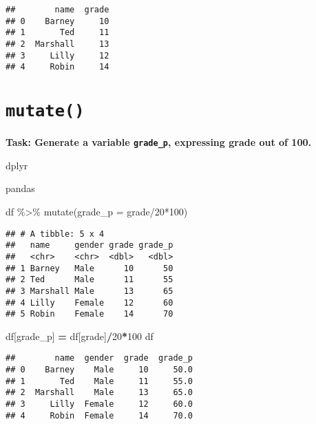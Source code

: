 \documentclass[
]{book}
\newenvironment{Shaded}{\begin{snugshade}}{\end{snugshade}}
\newcommand{\AttributeTok}[1]{\textcolor[rgb]{0.77,0.63,0.00}{#1}}
\newcommand{\DecValTok}[1]{\textcolor[rgb]{0.00,0.00,0.81}{#1}}
\newcommand{\FunctionTok}[1]{\textcolor[rgb]{0.00,0.00,0.00}{#1}}
\newcommand{\NormalTok}[1]{#1}
\newcommand{\OperatorTok}[1]{\textcolor[rgb]{0.81,0.36,0.00}{\textbf{#1}}}
\newcommand{\SpecialCharTok}[1]{\textcolor[rgb]{0.00,0.00,0.00}{#1}}
\newcommand{\StringTok}[1]{\textcolor[rgb]{0.31,0.60,0.02}{#1}}
\begin{document}
\begin{verbatim}
##        name  grade
## 0    Barney     10
## 1       Ted     11
## 2  Marshall     13
## 3     Lilly     12
## 4     Robin     14
\end{verbatim}

\hypertarget{mutate}{%
\section{\texorpdfstring{\texttt{mutate()}}{mutate()}}\label{mutate}}

{\textbf{Task: Generate a variable \texttt{grade\_p}, expressing grade out of 100.
}}

dplyr

pandas

\begin{Shaded}
\begin{Highlighting}[]
\NormalTok{df }\SpecialCharTok{\%\textgreater{}\%} 
  \FunctionTok{mutate}\NormalTok{(}\AttributeTok{grade\_p =}\NormalTok{ grade}\SpecialCharTok{/}\DecValTok{20}\SpecialCharTok{*}\DecValTok{100}\NormalTok{)}
\end{Highlighting}
\end{Shaded}

\begin{verbatim}
## # A tibble: 5 x 4
##   name     gender grade grade_p
##   <chr>    <chr>  <dbl>   <dbl>
## 1 Barney   Male      10      50
## 2 Ted      Male      11      55
## 3 Marshall Male      13      65
## 4 Lilly    Female    12      60
## 5 Robin    Female    14      70
\end{verbatim}

\begin{Shaded}
\begin{Highlighting}[]
\NormalTok{df[}\StringTok{\textquotesingle{}grade\_p\textquotesingle{}}\NormalTok{] }\OperatorTok{=}\NormalTok{ df[}\StringTok{\textquotesingle{}grade\textquotesingle{}}\NormalTok{]}\OperatorTok{/}\DecValTok{20}\OperatorTok{*}\DecValTok{100}
\NormalTok{df}
\end{Highlighting}
\end{Shaded}

\begin{verbatim}
##        name  gender  grade  grade_p
## 0    Barney    Male     10     50.0
## 1       Ted    Male     11     55.0
## 2  Marshall    Male     13     65.0
## 3     Lilly  Female     12     60.0
## 4     Robin  Female     14     70.0
\end{verbatim}
\end{document}
